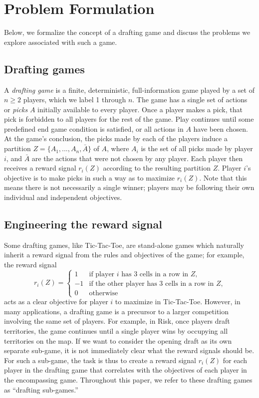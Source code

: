 \documentclass[letterpaper]{article}
\numberwithin{equation}{section}
\numberwithin{theorem}{section}
\numberwithin{lemma}{section}
\numberwithin{df}{section}
\begin{document}
\section{Problem Formulation}
\label{sec:Prob}

Below, we formalize the concept of a drafting game and discuss the problems we explore associated with such a game.

\subsection{Drafting games}
\label{subsec:DraftingGames}

A \emph{drafting game} is a finite, deterministic, full-information game played by a set of $n \geq 2$ players, which we label 1 through $n$.  The game has a single set of actions or \emph{picks} $A$ initially available to every player.  Once a player makes a pick, that pick is forbidden to all players for the rest of the game.  Play continues until some predefined end game condition is satisfied, or all actions in $A$ have been chosen.  At the game's conclusion, the picks made by each of the players induce a partition $Z = \{A_1, ..., A_{n}, \bar{A}\}$ of $A$, where $A_i$ is the set of all picks made by player $i$, and $\bar{A}$ are the actions that were not chosen by any player.  Each player then receives a reward signal $r_i(Z)$ according to the resulting partition $Z$.  Player $i$'s objective is to make picks in such a way as to maximize $r_i(Z)$.  Note that this means there is not necessarily a single winner; players may be following their own individual and independent objectives.

\subsection{Engineering the reward signal}

Some drafting games, like Tic-Tac-Toe, are stand-alone games which naturally inherit a reward signal from the rules and objectives of the game; for example, the reward signal
\[ r_i(Z) = \left\{ \begin{array}{cl} 1 & \text{if player $i$ has 3 cells in a row in $Z$,} \\ -1 & \text{if the other player has 3 cells in a row in $Z$,} \\ 0 & \text{otherwise} \end{array} \right. \]
acts as a clear objective for player $i$ to maximize in Tic-Tac-Toe.  However, in many applications, a drafting game is a precursor to a larger competition involving the same set of players.  For example, in Risk, once players draft territories, the game continues until a single player wins by occupying all territories on the map.  If we want to consider the opening draft as its own separate sub-game, it is not immediately clear what the reward signals should be.  For such a sub-game, the task is thus to create a reward signal $r_i(Z)$ for each player in the drafting game that correlates with the objectives of each player in the encompassing game.  Throughout this paper, we refer to these drafting games as ``drafting sub-games.''
\end{document}
